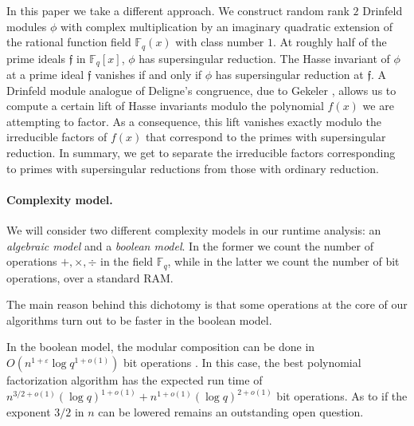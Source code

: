 \documentclass[12pt]{article}
\theoremstyle{plain}
\theoremstyle{definition}
\def\F{\ensuremath{\mathbb{F}}}
\def\MM{\ensuremath{\mathsf{M}}}
\def\CC{\ensuremath{\mathsf{C}}}
\newcommand{\f}{\mathfrak f}
\begin{document}
In this paper we take a different approach. We construct random rank
$2$ Drinfeld modules $\phi$ with complex multiplication by an
imaginary quadratic extension of the rational function field $\F_q(x)$
with class number $1$. At roughly half of the prime ideals $\f$ in
$\F_q[x]$, $\phi$ has supersingular reduction. The Hasse invariant of
$\phi$ at a prime ideal $\f$ vanishes if and only if $\phi$ has
supersingular reduction at $\f$. A Drinfeld module analogue of
Deligne's congruence, due to Gekeler \cite{gek}, allows us to compute
a certain lift of Hasse invariants modulo the polynomial $f(x)$ we are
attempting to factor. As a consequence, this lift vanishes exactly
modulo the irreducible factors of $f(x)$ that correspond to the primes
with supersingular reduction. In summary, we get to separate the
irreducible factors corresponding to primes with supersingular
reductions from those with ordinary reduction.


\paragraph{Complexity model.}
We will consider two different complexity models in our runtime
analysis: an \textit{algebraic model} and a \textit{boolean model}. In
the former we count the number of operations $+, \times, \div$ in the
field $\F_q$, while in the latter we count the number of bit
operations, over a standard RAM. 

The main reason behind this dichotomy is that some operations at the
core of our algorithms turn out to be faster in the boolean model.



In the boolean model, the modular composition can be done in $O(n^{1 +
  \varepsilon}\log q^{1 + o(1)})$ bit operations \cite{ku}. In this
case, the best polynomial factorization algorithm has the expected run
time of $n^{3/2+o(1)} (\log q)^{1+o(1)}+n^{1+o(1)} (\log q)^{2+o(1)}$
bit operations.  As to if the exponent $3/2$ in $n$ can be lowered
remains an outstanding open question.
\end{document}
